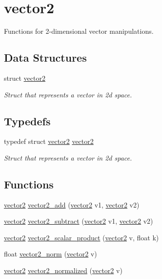\hypertarget{group__vector2}{}\section{vector2}
\label{group__vector2}


Functions for 2-\/dimensional vector manipulations.  


\subsection*{Data Structures}
\begin{DoxyCompactItemize}
\item 
struct \hyperlink{structvector2}{vector2}
\begin{DoxyCompactList}\small\item\em Struct that represents a vector in 2d space. \end{DoxyCompactList}\end{DoxyCompactItemize}
\subsection*{Typedefs}
\begin{DoxyCompactItemize}
\item 
typedef struct \hyperlink{structvector2}{vector2} \hyperlink{group__vector2_ga79bfbffebc693e35657aa7eec9499688}{vector2}
\begin{DoxyCompactList}\small\item\em Struct that represents a vector in 2d space. \end{DoxyCompactList}\end{DoxyCompactItemize}
\subsection*{Functions}
\begin{DoxyCompactItemize}
\item 
\hyperlink{structvector2}{vector2} \hyperlink{group__vector2_ga8a53b9698cf1172ab388531dcd3d8399}{vector2\+\_\+add} (\hyperlink{structvector2}{vector2} v1, \hyperlink{structvector2}{vector2} v2)
\item 
\hyperlink{structvector2}{vector2} \hyperlink{group__vector2_ga7a403a2bce25c9ee0fd5e6fc30a8f9ea}{vector2\+\_\+subtract} (\hyperlink{structvector2}{vector2} v1, \hyperlink{structvector2}{vector2} v2)
\item 
\hyperlink{structvector2}{vector2} \hyperlink{group__vector2_gab71f45ca9825acdbf70c639cf4a5d09c}{vector2\+\_\+scalar\+\_\+product} (\hyperlink{structvector2}{vector2} v, float k)
\item 
float \hyperlink{group__vector2_ga03173bb05b63e8723fc6e54cf55dff71}{vector2\+\_\+norm} (\hyperlink{structvector2}{vector2} v)
\item 
\hyperlink{structvector2}{vector2} \hyperlink{group__vector2_gaa3e831b3dbed8e51233f48de98c3266e}{vector2\+\_\+normalized} (\hyperlink{structvector2}{vector2} v)
\end{DoxyCompactItemize}


